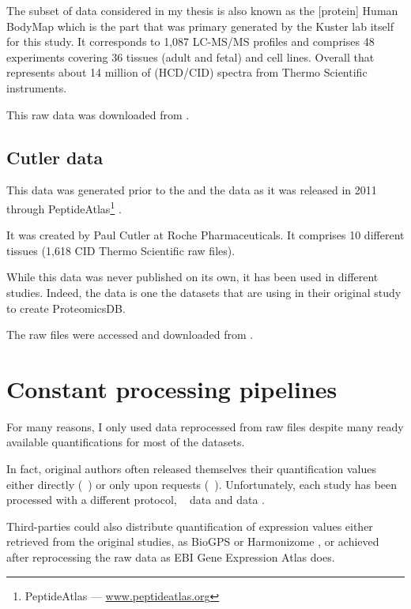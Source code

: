 The subset of data considered in my thesis is also
known as the [protein] Human BodyMap which is the part that was primary generated
by the Kuster lab itself for this study. It corresponds to 1,087 \gls{LC-MS/MS}
profiles and comprises 48 experiments covering 36 tissues (adult and fetal) and
cell lines. Overall that represents about 14 million of (\gls{HCD}/\gls{CID})
spectra from Thermo Scientific instruments.

This raw data was downloaded from .

\subsection{Cutler data}
\begin{comment}
    rexpliquer quelle partie reutilisée
\end{comment}

This data was generated prior to the  and the 
data as it was released in 2011 through PeptideAtlas\footnote{PeptideAtlas --- %
\href{http://www.peptideatlas.org/}{www.peptideatlas.org}}
\citep{PeptideAtlas}.

It was created by Paul Cutler at Roche Pharmaceuticals.
It comprises 10 different tissues (1,618 \gls{CID} Thermo Scientific raw files).

While this data was never published on its own, it has been used in different
studies. Indeed, the  data is one the datasets that
\cite{KusterData} are using in their original study to create ProteomicsDB.

The raw files were accessed and downloaded from .

\section{Constant processing pipelines}

For many reasons, I only used data reprocessed from raw files despite many
ready available quantifications for most of the datasets.

In fact, original authors often released themselves their quantification values
either directly (\eg\ \cite{Krupp2012})
or only upon requests (\eg\ \cite{PandeyData}). Unfortunately, each study has
been processed with a different protocol, \eg\ \dataset{\Gtex}
data \citep{GTExTranscript} and  data \citep{Krupp2012}.

Third-parties could also distribute quantification of expression values either
retrieved from the original studies, as BioGPS \citep{BioGPS1} or
Harmonizome \citep{Harmonizome}, or achieved after reprocessing the raw data
as EBI Gene Expression Atlas \citep{EBIgxa} does.

